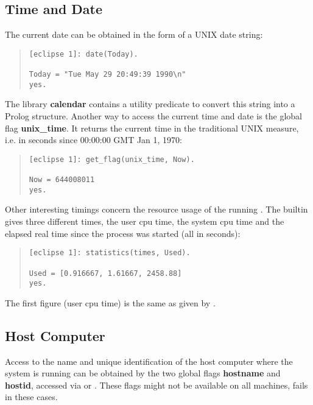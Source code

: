 \subsection{Time and Date}
The current date can be obtained in the form of a UNIX date string:
\begin{quote}\begin{verbatim}
[eclipse 1]: date(Today).

Today = "Tue May 29 20:49:39 1990\n"
yes.
\end{verbatim}\end{quote}
The library {\bf calendar} contains a utility predicate to convert
this string into a Prolog structure.
Another way to access the current time and date is the global flag
{\bf unix_time}. It returns the current time in the traditional UNIX
measure, i.e. in seconds since 00:00:00 GMT Jan 1, 1970:
\begin{quote}\begin{verbatim}
[eclipse 1]: get_flag(unix_time, Now).

Now = 644008011
yes.
\end{verbatim}\end{quote}
Other interesting timings concern the resource usage of the running {\eclipse}.
The  builtin gives three different times, the user
cpu time, the system cpu time and the elapsed real time since
the process was started (all in seconds):
\begin{quote}\begin{verbatim}
[eclipse 1]: statistics(times, Used).

Used = [0.916667, 1.61667, 2458.88]
yes.
\end{verbatim}\end{quote}
The first figure (user cpu time) is the same as given by .

\subsection{Host Computer}
Access to the name and unique identification of the host computer where
the system is running can be obtained by the two global flags
{\bf hostname} and {\bf hostid}, accessed via  or
. These flags might not be available on all machines,
 fails in these cases.

